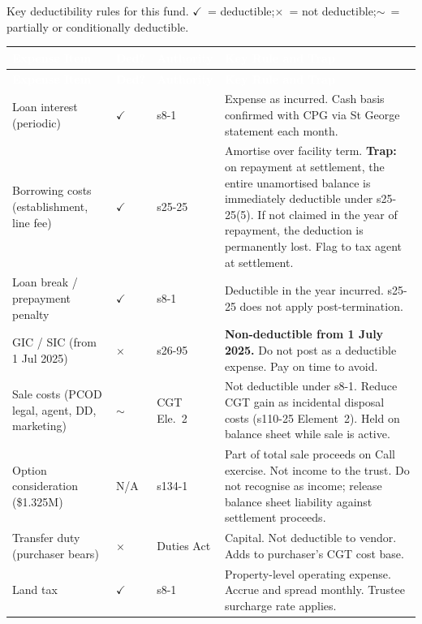 \documentclass[10pt,a4paper]{article}
\begin{document}
Key deductibility rules for this fund. \textbf{$\checkmark$}~= deductible;\enspace \textbf{$\times$}~= not deductible;\enspace \textbf{$\sim$}~= partially or conditionally deductible.

{\small\sffamily
\begin{longtable}{@{} L{4.2cm} C{0.7cm} L{1.8cm} L{5.6cm} @{}}
\textcolor{white}{\bfseries Expense Item} & \textcolor{white}{\bfseries Ded?} & \textcolor{white}{\bfseries Authority} & \textcolor{white}{\bfseries Key Rule and Trap} \\
\midrule
\endfirsthead
{}\textcolor{white}{\bfseries Expense Item} & \textcolor{white}{\bfseries Ded?} & \textcolor{white}{\bfseries Authority} & \textcolor{white}{\bfseries Key Rule and Trap} \\
\midrule
\endhead
Loan interest (periodic) & $\checkmark$ & s8-1 & Expense as incurred. Cash basis confirmed with CPG via St George statement each month. \\
Borrowing costs (establishment, line fee) & $\checkmark$ & s25-25 & Amortise over facility term. \textbf{Trap:} on repayment at settlement, the entire unamortised balance is immediately deductible under s25-25(5). If not claimed in the year of repayment, the deduction is permanently lost. Flag to tax agent at settlement. \\
Loan break / prepayment penalty & $\checkmark$ & s8-1 & Deductible in the year incurred. s25-25 does not apply post-termination. \\
GIC / SIC (from 1 Jul 2025) & $\times$ & s26-95 & \textbf{Non-deductible from 1 July 2025.} Do not post as a deductible expense. Pay on time to avoid. \\
Sale costs (PCOD legal, agent, DD, marketing) & $\sim$ & CGT Ele.~2 & Not deductible under s8-1. Reduce CGT gain as incidental disposal costs (s110-25 Element~2). Held on balance sheet while sale is active. \\
Option consideration (\$1.325M) & N/A & s134-1 & Part of total sale proceeds on Call exercise. Not income to the trust. Do not recognise as income; release balance sheet liability against settlement proceeds. \\
Transfer duty (purchaser bears) & $\times$ & Duties Act & Capital. Not deductible to vendor. Adds to purchaser's CGT cost base. \\
Land tax & $\checkmark$ & s8-1 & Property-level operating expense. Accrue and spread monthly. Trustee surcharge rate applies. \\

\end{longtable}}
\end{document}
